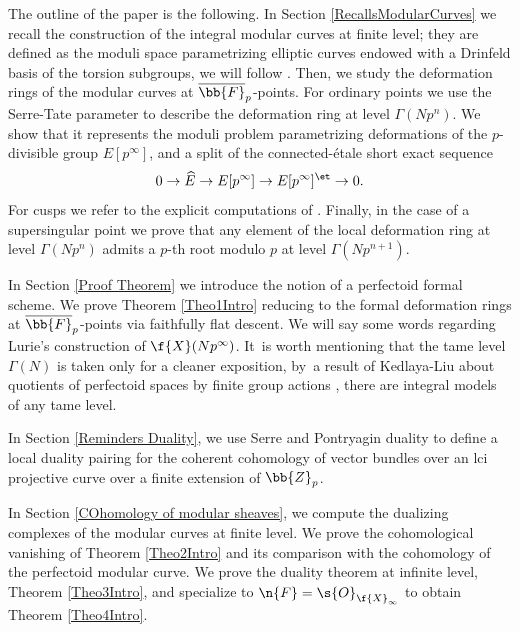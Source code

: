 The outline of the paper is the following. In Section \ref{RecallsModularCurves} we recall the construction of the integral modular curves at finite level; they are defined as the moduli space parametrizing elliptic curves endowed with a Drinfeld basis of the torsion subgroups, we will follow \cite{katz1985arithmetic}. Then, we study the deformation rings of the modular curves at $\overline{\bb{F}}_p$-points. For ordinary points we use the Serre-Tate parameter to describe the deformation ring at level $\Gamma(Np^n)$. We show that it represents the moduli problem parametrizing deformations of the $p$-divisible group $E[p^\infty]$, and a split of the connected-étale short exact sequence
\[
0\to \widehat{E} \to E[p^\infty] \to E[p^\infty]^{\et}\to 0.
\]
For cusps we refer to the explicit computations of \cite[\S\S 8 \& 10]{katz1985arithmetic}. Finally, in the case of a supersingular point we prove that any element of the local deformation ring at level $\Gamma(Np^n)$ admits a $p$-th root modulo $p$ at level $\Gamma(Np^{n+1})$.

In Section \ref{Proof Theorem} we introduce the notion of a perfectoid formal scheme. We prove Theorem \ref{Theo1Intro} reducing to the formal deformation rings at $\overline{\bb{F}}_p$-points via faithfully flat descent. We will say some words regarding Lurie's construction of $\f{X}(Np^\infty)$. It~is worth mentioning that the tame level $\Gamma(N)$ is taken only for a cleaner exposition, by~a result of Kedlaya-Liu about quotients of perfectoid spaces by finite group actions \cite[Th.\,3.3.26]{kedlaya2016relative}, there are integral models of any tame level.

In Section \ref{Reminders Duality}, we use Serre and Pontryagin duality to define a local duality pairing for the coherent cohomology of vector bundles over an lci projective curve over a finite extension of $\bb{Z}_p$.

In Section \ref{COhomology of modular sheaves}, we compute the dualizing complexes of the modular curves at finite level. We prove the cohomological vanishing of Theorem \ref{Theo2Intro} and its comparison with the cohomology of the perfectoid modular curve. We prove the duality theorem at infinite level, Theorem \ref{Theo3Intro}, and specialize to $\n{F}=\s{O}_{\f{X}_{\infty}}$ to obtain Theorem \ref{Theo4Intro}.

